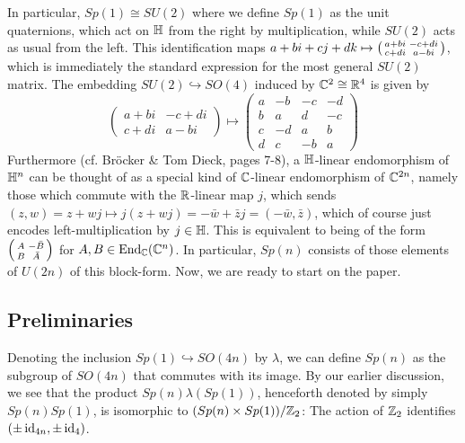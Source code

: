 \documentclass{scrartcl}
\begin{document}
In particular, $Sp(1)\cong SU(2)$ where we define $Sp(1)$ as the unit quaternions, which act on $\mathbb{H}$ from the right by multiplication, while $SU(2)$ acts as usual from the left. This identification maps $a+bi+cj+dk\mapsto 
\begin{psmallmatrix}
	a+bi & -c+di \\ c+di & a-bi
\end{psmallmatrix}$, which is immediately the standard expression for the most general $SU(2)$ matrix. The embedding $SU(2)\hookrightarrow SO(4)$ induced by $\mathbb{C}^2\cong \mathbb{R}^4$ is given by
\begin{equation*}
	\begin{pmatrix}
		a+bi & -c+di \\
		c+ di& a-bi
	\end{pmatrix}
	\longmapsto
	\begin{pmatrix}
		a & -b & -c & -d \\
		b & a & d & -c \\
		c & -d & a & b \\
		d & c & -b & a
	\end{pmatrix}
\end{equation*}
Furthermore (cf. Br\"ocker \& Tom Dieck, pages 7-8), a $\mathbb{H}$-linear endomorphism of $\mathbb{H}^n$ can be thought of as a special kind of $\mathbb{C}$-linear endomorphism of $\mathbb{C}^{2n}$, namely those which commute with the $\mathbb{R}$-linear map $j$, which sends $(z,w)=z+wj\mapsto j(z+wj)=-\bar w+\bar zj=(-\bar w,\bar z)$, which of course just encodes left-multiplication by $j\in \mathbb{H}$. This is equivalent to being of the form 
$\begin{psmallmatrix}
	A & -\bar B \\ B & \bar A
\end{psmallmatrix}$ for $A,B\in \operatorname{End}_{\mathbb{C}}(\mathbb{C}^n)$. In particular, $Sp(n)$ consists of those elements of $U(2n)$ of this block-form. Now, we are ready to start on the paper.

\subsection{Preliminaries}

Denoting the inclusion $Sp(1)\hookrightarrow SO(4n)$ by $\lambda$, we can define $Sp(n)$ as the subgroup of $SO(4n)$ that commutes with its image. By our earlier discussion, we see that the product $Sp(n)\lambda(Sp(1))$, henceforth denoted by simply $Sp(n)Sp(1)$, is isomorphic to $(Sp(n)\times Sp(1))/\mathbb{Z}_2$: The action of $\mathbb{Z}_2$ identifies $(\pm \operatorname{id}_{4n},\pm\operatorname{id}_4)$.
\end{document}
